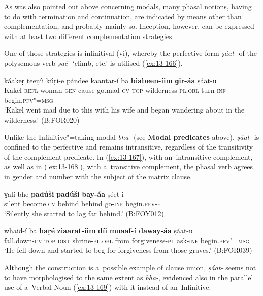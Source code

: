  As was also pointed out above concerning modals, many phasal notions, having to do with termination and continuation, are indicated by means other than complementation, and probably mainly so. Inception, however, can be expressed with at least two different complementation strategies.


One of those strategies is infinitival (vi), whereby the perfective form \textit{ṣáat-} of the polysemous verb \textit{ṣač-} `climb, etc.' is utilised (\ref{ex:13-166}). 

\begin{exe}
\ex
\label{ex:13-166}
\gll káakeṛ teeṇíi kúṛi-e pándee kaantar-í ba  \textbf{biabeen-íim} \textbf{ɡir-áa} ṣáat-u \\
Kakel \textsc{ refl} woman-\textsc{gen} cause go.mad-\textsc{cv} \textsc{top} wilderness-\textsc{pl.obl} turn-\textsc{inf} begin.\textsc{pfv"=msg} \\
\glt `Kakel went mad due to this with his wife and began wandering about in the wilderness.' (B:FOR020) 
\end{exe}

Unlike the Infinitive"=taking modal \textit{bha-} (see \textbf{Modal predicates} above), \textit{ṣáat-} is confined to the perfective and remains intransitive, regardless of the transitivity of the complement predicate. In (\ref{ex:13-167}), with an~intransitive complement, as well as in (\ref{ex:13-168}), with a~transitive complement, the phasal verb agrees in gender and number with the subject of the matrix clause.

\begin{exe}
\ex
\label{ex:13-167}
\gll ɣalí bhe \textbf{padúši} \textbf{padúši} \textbf{bay-áa} ṣéet-i  \\
silent become.\textsc{cv} behind behind go-\textsc{inf} begin.\textsc{pfv-f} \\
\glt `Silently she started to lag far behind.' (B:FOY012)

\ex
\label{ex:13-168}
\gll whaid-í ba \textbf{haṛé} \textbf{ziaarat-íim} \textbf{díi} \textbf{ muaaf-í daway-áa} ṣáat-u\\
fall.down-\textsc{cv} \textsc{top} \textsc{dist} shrine-\textsc{pl.obl} from forgiveness-\textsc{pl} ask-\textsc{inf} begin.\textsc{pfv"=msg}\\
\glt `He fell down and started to beg for forgiveness from those graves.' (B:FOR039) 
\end{exe}

Although the construction is a~possible example of clause union, \textit{ṣáat-} seems not to have morphologised to the same extent as \textit{bha-}, evidenced also in the parallel use of a~Verbal Noun (\ref{ex:13-169}) with it instead of an~Infinitive. 

